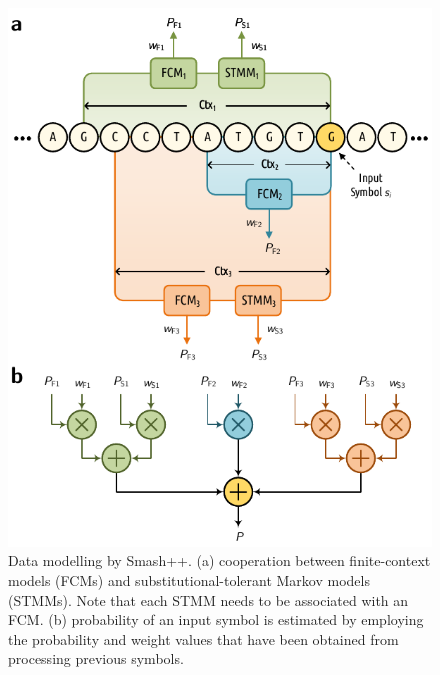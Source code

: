 \documentclass[a4paper,num-refs]{oup-contemporary}
\begin{document}
\begin{figure}[!t]
  \centering
  \includegraphics[width=\columnwidth]{data_model.pdf}
  \caption{Data modelling by Smash++. (a) cooperation between finite-context models (FCMs) and substitutional-tolerant Markov models (STMMs). Note that each STMM needs to be associated with an FCM. (b) probability of an input symbol is estimated by employing the probability and weight values that have been obtained from processing previous symbols.}
  \label{fig.model}
\end{figure}
\end{document}
